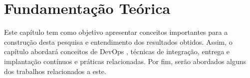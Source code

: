 \chapter{Fundamentação Teórica}

Este capítulo tem como objetivo apresentar conceitos importantes para a
construção desta pesquisa e entendimento dos resultados obtidos. Assim, o capítulo abordará conceitos de DevOps \cite{devopsWiki}, técnicas de integração, entrega e implantação contínuos \cite{fowlerCI, fowlerCD} e práticas relacionadas. Por fim, serão abordados alguns dos trabalhos relacionados a este.




    


